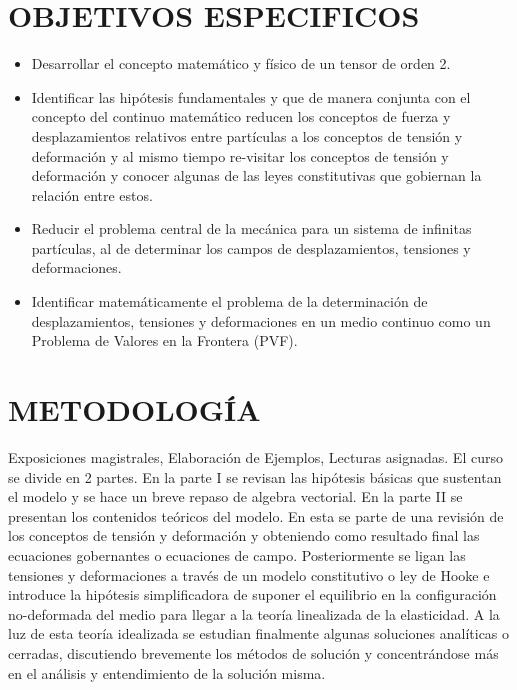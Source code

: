\section*{OBJETIVOS ESPECIFICOS}
%
\begin{itemize}
%
	\item Desarrollar el concepto matemático y físico de un tensor de orden 2. 
	\item Identificar las hipótesis fundamentales y que de manera conjunta con el concepto del continuo matemático reducen los conceptos de fuerza y desplazamientos relativos entre partículas a los conceptos de tensión y deformación y al mismo tiempo re-visitar los conceptos de tensión y deformación y conocer algunas de las leyes constitutivas que gobiernan la relación entre estos.
	\item Reducir el problema central de la mecánica para un sistema de infinitas partículas, al de determinar los campos de desplazamientos, tensiones y deformaciones.
	\item Identificar matemáticamente el problema de la determinación de desplazamientos, tensiones y deformaciones en un medio continuo como un Problema de Valores en la Frontera (PVF).
%
\end{itemize}
%
\section*{METODOLOGÍA}
%
Exposiciones magistrales, Elaboración de Ejemplos, Lecturas asignadas. El curso se divide en 2 partes.  En la parte I se revisan las hipótesis básicas que sustentan el modelo y se hace un breve repaso de algebra vectorial. En la parte II se presentan los contenidos teóricos del modelo. En esta se parte de una revisión de los conceptos de tensión y deformación y obteniendo como resultado final las ecuaciones gobernantes o ecuaciones de campo.  Posteriormente se ligan las tensiones y deformaciones a través de un modelo constitutivo o ley de Hooke e introduce la hipótesis simplificadora de suponer el equilibrio en la configuración no-deformada del medio para llegar a la teoría linealizada de la elasticidad.  A la luz de esta teoría idealizada se estudian finalmente algunas soluciones analíticas o cerradas, discutiendo brevemente los métodos de solución y concentrándose más en el análisis y entendimiento de la solución misma.
%
%
